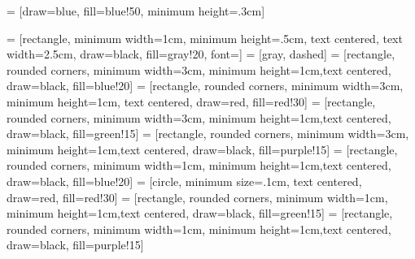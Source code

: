 
\theoremstyle{definition}
\newtheorem{thm}{Theorem}[chapter]
\newtheorem{defn}[thm]{Definition}
\newtheorem{lem}[thm]{Lemma}
\newtheorem{cor}[thm]{Corollary}
\newtheorem{conj}[thm]{Conjecture}
\newtheorem{prop}[thm]{Proposition}
\newtheorem{alg}[thm]{Algorithm}




\usetikzlibrary{cd}
\usetikzlibrary{matrix}
\usetikzlibrary{shapes.geometric}
\usetikzlibrary{arrows}
\usetikzlibrary{quantikz2}

 = [draw=blue, fill=blue!50, minimum height=.3cm]

 = [rectangle, minimum width=1cm, minimum height=.5cm, text
centered, text width=2.5cm, draw=black, fill=gray!20, font=\footnotesize]
 = [gray, dashed]
 = [rectangle, rounded corners, minimum width=3cm, minimum
height=1cm,text centered, draw=black, fill=blue!20]
 = [rectangle, rounded corners, minimum width=3cm, minimum height=1cm, text
centered, draw=red, fill=red!30]
 = [rectangle, rounded corners, minimum width=3cm, minimum
height=1cm,text centered, draw=black, fill=green!15]
 = [rectangle, rounded corners, minimum width=3cm, minimum
height=1cm,text centered, draw=black, fill=purple!15]
 = [rectangle, rounded corners, minimum width=1cm, minimum
height=1cm,text centered, draw=black, fill=blue!20]
 = [circle, minimum size=.1cm, text centered, draw=red, fill=red!30]
 = [rectangle, rounded corners, minimum width=1cm, minimum
height=1cm,text centered, draw=black, fill=green!15]
 = [rectangle, rounded corners, minimum width=1cm, minimum
height=1cm,text centered, draw=black, fill=purple!15]

